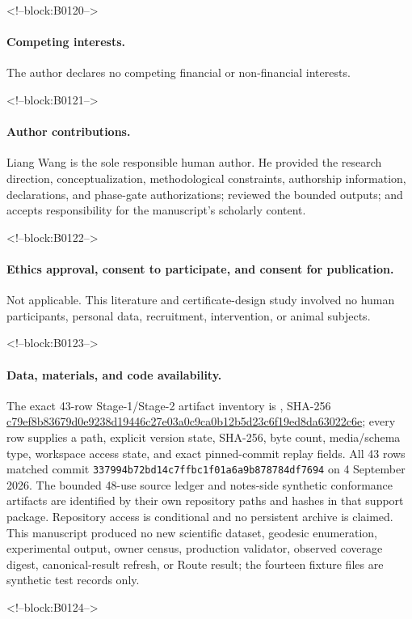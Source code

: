 \documentclass[11pt,a4paper]{article}
\begin{document}
<!--block:B0120-->
\paragraph{Competing interests.}
The author declares no competing financial or non-financial interests.

<!--block:B0121-->
\paragraph{Author contributions.}
Liang Wang is the sole responsible human author. He provided the research direction, conceptualization, methodological constraints, authorship information, declarations, and phase-gate authorizations; reviewed the bounded outputs; and accepts responsibility for the manuscript's scholarly content.

<!--block:B0122-->
\paragraph{Ethics approval, consent to participate, and consent for publication.}
Not applicable. This literature and certificate-design study involved no human participants, personal data, recruitment, intervention, or animal subjects.

<!--block:B0123-->
\paragraph{Data, materials, and code availability.}
The exact 43-row Stage-1/Stage-2 artifact inventory is , SHA-256 \url{c79ef8b83679d0e9238d19446c27e03a0c9ca0b12b5d23c6f19ed8da63022c6e}; every row supplies a path, explicit version state, SHA-256, byte count, media/schema type, workspace access state, and exact pinned-commit replay fields. All 43 rows matched commit \texttt{337994b72bd14c7ffbc1f01a6a9b878784df7694} on 4 September 2026. The bounded 48-use source ledger and notes-side synthetic conformance artifacts are identified by their own repository paths and hashes in that support package. Repository access is conditional and no persistent archive is claimed. This manuscript produced no new scientific dataset, geodesic enumeration, experimental output, owner census, production validator, observed coverage digest, canonical-result refresh, or Route result; the fourteen fixture files are synthetic test records only.

<!--block:B0124-->
\end{document}
